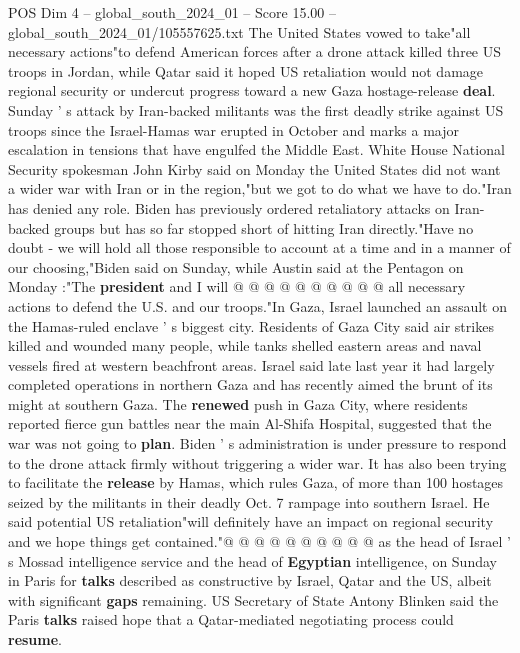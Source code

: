 \begin{textsample}{POS Dim 4 – global\_south\_2024\_01 – Score 15.00 – global\_south\_2024\_01/105557625.txt}  \label{ex:f4_pos_374}
The United States vowed to take"all necessary actions"to defend American forces after a drone attack killed three US troops in Jordan, while Qatar said it hoped US retaliation would not damage regional security or undercut progress toward a new Gaza hostage-release \textbf{deal}.
Sunday ' s attack by Iran-backed militants was the first deadly strike against US troops since the Israel-Hamas war erupted in October and marks a major escalation in tensions that have engulfed the Middle East.
White House National Security spokesman John Kirby said on Monday the United States did not want a wider war with Iran or in the region,"but we got to do what we have to do."Iran has denied any role.
Biden has previously ordered retaliatory attacks on Iran-backed groups but has so far stopped short of hitting Iran directly."Have no doubt - we will hold all those responsible to account at a time and in a manner of our choosing,"Biden said on Sunday, while Austin said at the Pentagon on Monday :"The \textbf{president} and I will @ @ @ @ @ @ @ @ @ @ all necessary actions to defend the U.S. and our troops."In Gaza, Israel launched an assault on the Hamas-ruled enclave ' s biggest city.
Residents of Gaza City said air strikes killed and wounded many people, while tanks shelled eastern areas and naval vessels fired at western beachfront areas.
Israel said late last year it had largely completed operations in northern Gaza and has recently aimed the brunt of its might at southern Gaza.
The \textbf{renewed} push in Gaza City, where residents reported fierce gun battles near the main Al-Shifa Hospital, suggested that the war was not going to \textbf{plan}.
Biden ' s administration is under pressure to respond to the drone attack firmly without triggering a wider war.
It has also been trying to facilitate the \textbf{release} by Hamas, which rules Gaza, of more than 100 hostages seized by the militants in their deadly Oct. 7 rampage into southern Israel.
He said potential US retaliation"will definitely have an impact on regional security and we hope things get contained."@ @ @ @ @ @ @ @ @ @ as the head of Israel ' s Mossad intelligence service and the head of \textbf{Egyptian} intelligence, on Sunday in Paris for \textbf{talks} described as constructive by Israel, Qatar and the US, albeit with significant \textbf{gaps} remaining.
US Secretary of State Antony Blinken said the Paris \textbf{talks} raised hope that a Qatar-mediated negotiating process could \textbf{resume}.

\end{textsample}
